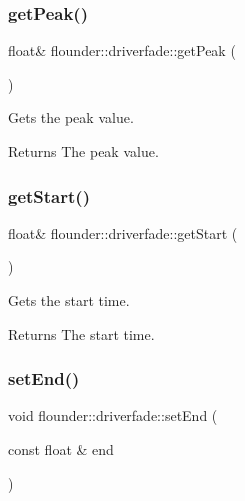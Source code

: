 \subsubsection{\texorpdfstring{get\+Peak()}{getPeak()}}
{\footnotesize\ttfamily float\& flounder\+::driverfade\+::get\+Peak (\begin{DoxyParamCaption}{ }\end{DoxyParamCaption})\hspace{0.3cm}{\ttfamily [inline]}}



Gets the peak value. 

\begin{DoxyReturn}{Returns}
The peak value. 
\end{DoxyReturn}
\mbox{\label{classflounder_1_1driverfade_a16f5ada8b7e3708f57ec4dee87b5bd59}} 
\subsubsection{\texorpdfstring{get\+Start()}{getStart()}}
{\footnotesize\ttfamily float\& flounder\+::driverfade\+::get\+Start (\begin{DoxyParamCaption}{ }\end{DoxyParamCaption})\hspace{0.3cm}{\ttfamily [inline]}}



Gets the start time. 

\begin{DoxyReturn}{Returns}
The start time. 
\end{DoxyReturn}
\mbox{\label{classflounder_1_1driverfade_aa4cec5e23d739ade9704cd09062c8e61}} 
\subsubsection{\texorpdfstring{set\+End()}{setEnd()}}
{\footnotesize\ttfamily void flounder\+::driverfade\+::set\+End (\begin{DoxyParamCaption}\item[{const float \&}]{end }\end{DoxyParamCaption})\hspace{0.3cm}{\ttfamily [inline]}}



